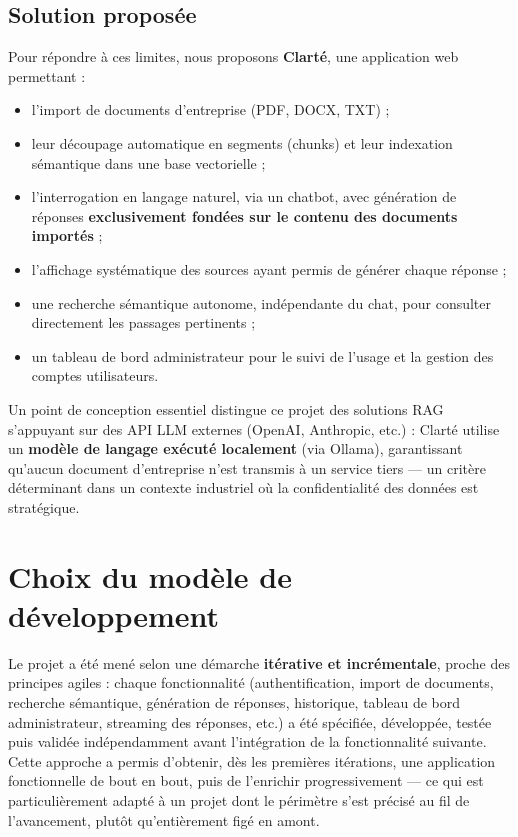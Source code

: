\documentclass[12pt,a4paper]{report}
\begin{document}
\subsection{Solution proposée}
Pour répondre à ces limites, nous proposons \textbf{Clarté}, une application web permettant :
\begin{itemize}
  \item l'import de documents d'entreprise (PDF, DOCX, TXT) ;
  \item leur découpage automatique en segments (chunks) et leur indexation sémantique dans une base vectorielle ;
  \item l'interrogation en langage naturel, via un chatbot, avec génération de réponses \textbf{exclusivement fondées sur le contenu des documents importés} ;
  \item l'affichage systématique des sources ayant permis de générer chaque réponse ;
  \item une recherche sémantique autonome, indépendante du chat, pour consulter directement les passages pertinents ;
  \item un tableau de bord administrateur pour le suivi de l'usage et la gestion des comptes utilisateurs.
\end{itemize}

Un point de conception essentiel distingue ce projet des solutions RAG s'appuyant sur des API LLM externes (OpenAI, Anthropic, etc.) : Clarté utilise un \textbf{modèle de langage exécuté localement} (via Ollama), garantissant qu'aucun document d'entreprise n'est transmis à un service tiers — un critère déterminant dans un contexte industriel où la confidentialité des données est stratégique.

\section{Choix du modèle de développement}
Le projet a été mené selon une démarche \textbf{itérative et incrémentale}, proche des principes agiles : chaque fonctionnalité (authentification, import de documents, recherche sémantique, génération de réponses, historique, tableau de bord administrateur, streaming des réponses, etc.) a été spécifiée, développée, testée puis validée indépendamment avant l'intégration de la fonctionnalité suivante. Cette approche a permis d'obtenir, dès les premières itérations, une application fonctionnelle de bout en bout, puis de l'enrichir progressivement — ce qui est particulièrement adapté à un projet dont le périmètre s'est précisé au fil de l'avancement, plutôt qu'entièrement figé en amont.
\end{document}

